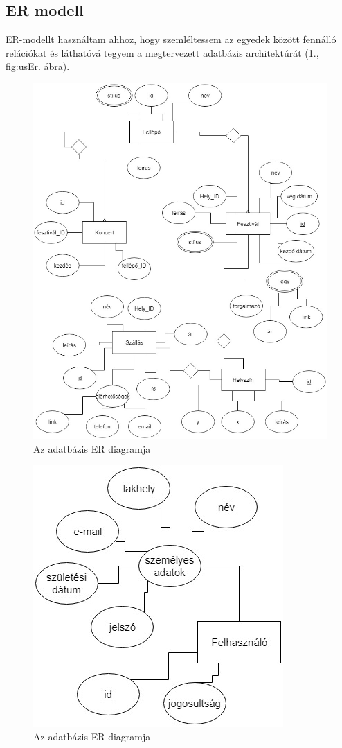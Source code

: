 \subsection{ER modell}

ER-modellt használtam ahhoz, hogy szemléltessem az egyedek között fennálló relációkat és láthatóvá tegyem a megtervezett adatbázis architektúrát (\ref{fig:er}., {fig:usEr}. ábra).

\begin{figure}
\centering
\includegraphics[scale=0.6]{kepek/er.jpg}
\caption{Az adatbázis ER diagramja}
\label{fig:er}
\end{figure}

\begin{figure}
\centering
\includegraphics[scale=0.6]{kepek/userER.jpg}
\caption{Az adatbázis ER diagramja}
\label{fig:usEr}
\end{figure}

